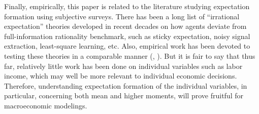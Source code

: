 Finally, empirically, this paper is related to the literature studying expectation formation using subjective surveys. There has been a long list of ``irrational expectation'' theories developed in recent decades on how agents deviate from full-information rationality benchmark, such as sticky expectation, noisy signal extraction, least-square learning, etc. Also, empirical work has been devoted to testing these theories in a comparable manner (\cite{coibion2012can},
\cite{fuhrer2018intrinsic}). But it is fair to say that thus far,
relatively little work has been done on individual variables such as labor income, which may well be more relevant to individual economic decisions. Therefore, understanding expectation formation of the individual variables, in particular, concerning both mean and higher moments, will prove fruitful for macroeconomic modelings.
